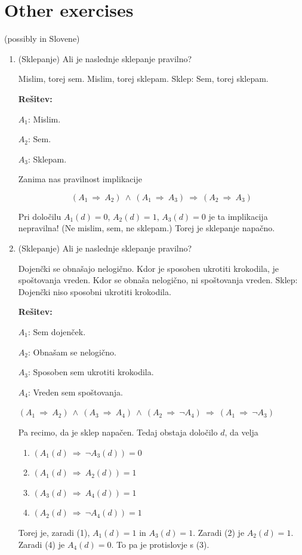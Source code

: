 \documentclass[11pt,paper=b5,footinclude,headinclude]{scrbook} %
\def\inn {{~\wedge~}}
\def\sledi {{~\Rightarrow~}}
\theoremstyle{remark}
\theoremstyle{definition} %
\theoremstyle{theorem} %
\begin{document}
\section{Other exercises}
(possibly in Slovene)
\begin{enumerate}

\item (Sklepanje)
Ali je naslednje sklepanje pravilno?

Mislim, torej sem. Mislim, torej sklepam. Sklep: Sem, torej sklepam.


\textbf{Rešitev:}

$A_1$: Mislim.

$A_2$: Sem.

$A_3$: Sklepam.

Zanima nas pravilnost implikacije

$$(A_1\sledi A_2)\inn(A_1\sledi A_3)\sledi(A_2\sledi A_3)$$

Pri določilu $A_1(d) = 0$, $A_2(d) = 1$, $A_3(d) = 0$ je ta implikacija nepravilna!
(Ne mislim, sem, ne sklepam.)
Torej je sklepanje napačno.

\bigskip

\item (Sklepanje)
Ali je naslednje sklepanje pravilno?

Dojenčki se obnašajo nelogično. Kdor je sposoben ukrotiti krokodila, je spoštovanja vreden.
Kdor se obnaša nelogično, ni spoštovanja vreden. Sklep: Dojenčki niso sposobni ukrotiti krokodila.


\textbf{Rešitev:}

$A_1$: Sem dojenček.

$A_2$: Obnašam se nelogično.

$A_3$: Sposoben sem ukrotiti krokodila.

$A_4$: Vreden sem spoštovanja.

$(A_1\sledi A_2)\inn (A_3\sledi A_4) \inn (A_2\sledi \neg A_4)\sledi (A_1\sledi \neg A_3)$

Pa recimo, da je sklep napačen. Tedaj obstaja določilo $d$, da velja
\begin{enumerate}[(1)]
  \item $(A_1(d)\sledi \neg A_3(d)) = 0$
  \item $(A_1(d)\sledi A_2(d)) = 1$
  \item $(A_3(d)\sledi A_4(d)) = 1$
  \item $(A_2(d)\sledi \neg A_4(d)) = 1$
\end{enumerate}
Torej je, zaradi (1), $A_1(d) = 1$ in $A_3(d) = 1$. Zaradi (2) je $A_2(d) = 1$.
Zaradi (4) je $A_4(d) = 0$. To pa je protislovje s (3).


\end{enumerate}
\end{document}
